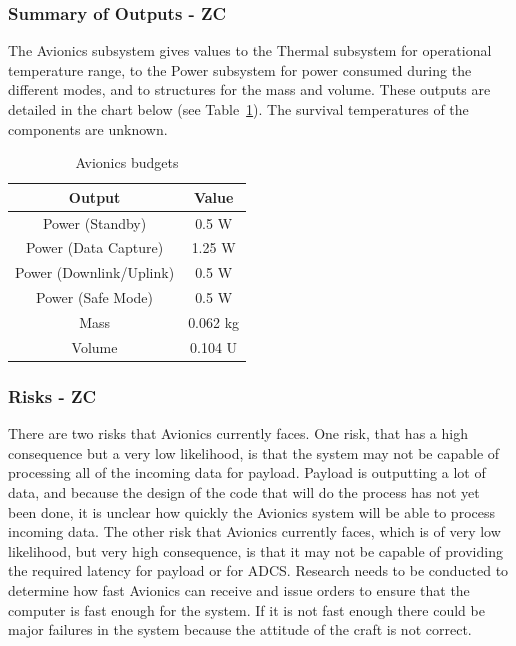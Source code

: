 \documentclass[12pt]{article}
\begin{document}
			\subsubsection{Summary of Outputs - ZC}

The Avionics subsystem gives values to the Thermal subsystem for operational temperature range, to the Power subsystem for power consumed during the different modes, and to structures for the mass and volume. These outputs are detailed in the chart below (see Table~\ref{table:avionics_summary_outputs}). The survival temperatures of the components are unknown.


\begin{table}[ht]
\caption{Avionics budgets}
\label{table:avionics_summary_outputs}
\begin{center}
    \begin{tabular}{|c||c|} \hline
    	\textbf{Output} & \textbf{Value} \\ \hline \hline
    Power (Standby) & 0.5 W  \\
    Power (Data Capture) & 1.25 W \\
    Power (Downlink/Uplink) & 0.5 W \\
    Power (Safe Mode) & 0.5 W \\
    Mass & 0.062 kg  \\
    Volume & 0.104 U \\ \hline 
    \end{tabular}
\end{center}
\end{table}

			\subsubsection{Risks - ZC}
There are two risks that Avionics currently faces. One risk, that has a high consequence but a very low likelihood, is that the system may not be capable of processing all of the incoming data for payload. Payload is outputting a lot of data, and because the design of the code that will do the process has not yet been done, it is unclear how quickly the Avionics system will be able to process incoming data. The other risk that Avionics currently faces, which is of very low likelihood, but very high consequence, is that it may not be capable of providing the required latency for payload or for ADCS. Research needs to be conducted to determine how fast Avionics can receive and issue orders to ensure that the computer is fast enough for the system. If it is not fast enough there could be major failures in the system because the attitude of the craft is not correct.
\end{document}
